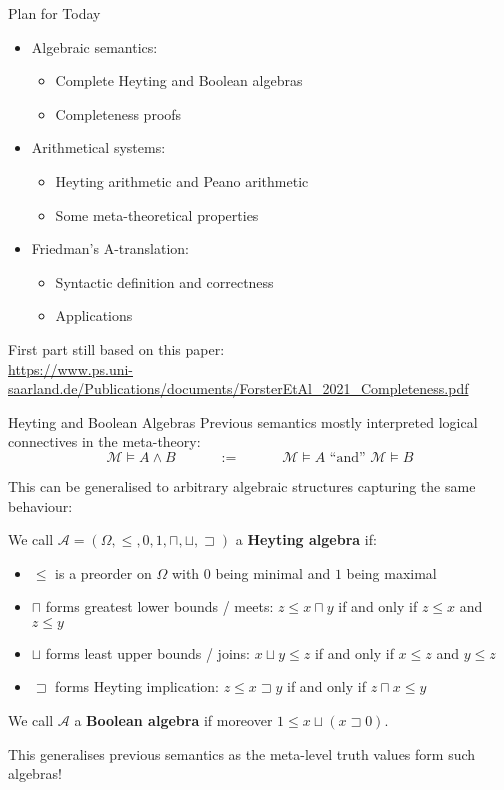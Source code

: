 \documentclass[xcolor=dvipsnames,aspectratio=169,handout]{beamer}
\newcommand{\MM}{\mathcal{M}}
\renewcommand{\AA}{\mathcal A}
\begin{document}
\begin{frame}{Plan for Today}
	\begin{itemize}
		\item 
		Algebraic semantics:
		\begin{itemize}
			\item
			Complete Heyting and Boolean algebras
			\item
			Completeness proofs
		\end{itemize}
		\vspace{0.3cm}
		\item
		Arithmetical systems:
		\begin{itemize}
			\item
			Heyting arithmetic and Peano arithmetic
			\item
			Some meta-theoretical properties
		\end{itemize}
		\vspace{0.3cm}
		\item
		Friedman's A-translation:
		\begin{itemize}
			\item
			Syntactic definition and correctness
			\item
			Applications
		\end{itemize}
	\end{itemize}
	
	\pause
	\vspace{0.5cm}
	First part still based on this paper:\\ \scriptsize \url{https://www.ps.uni-saarland.de/Publications/documents/ForsterEtAl_2021_Completeness.pdf}
\end{frame}


\begin{frame}{Heyting and Boolean Algebras}
	Previous semantics mostly interpreted logical connectives in the meta-theory:
	$$\MM\vDash A\land B \hspace{3em}:=\hspace{3em} \MM\vDash A \text{ ``and'' } \MM\vDash B$$
	\pause
	
	This can be generalised to arbitrary algebraic structures capturing the same behaviour:
	\pause
	\begin{definition}
		We call $\AA=(\Omega,\le,0,1,\sqcap,\sqcup,\sqsupset)$ a \textbf{Heyting algebra} if:
		\begin{itemize}
			\item
			$\le$ is a preorder on $\Omega$ with $0$ being minimal and $1$ being maximal
			\item
			$\sqcap$ forms greatest lower bounds / meets: $z\le x\sqcap y$ if and only if $z\le x$ and $z\le y$
			\item
			$\sqcup$ forms least upper bounds / joins: $x\sqcup y\le z$ if and only if $x\le z$ and $y\le z$
			\item
			$\sqsupset$ forms Heyting implication: $z\le x\sqsupset y$ if and only if $z\sqcap x \le y$
		\end{itemize}
		We call $\AA$ a \textbf{Boolean algebra} if moreover $1\le x\sqcup (x\sqsupset 0)$.
	\end{definition}
	\pause
	This generalises previous semantics as the meta-level truth values form such algebras!
\end{frame}
\end{document}
